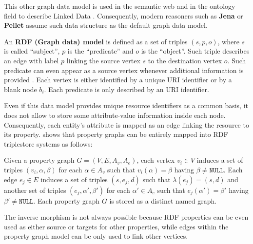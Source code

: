 \label{sec:rdfmodel}
This other graph data model is used in the semantic web  and in the ontology field to describe Linked Data
\cite{NautiLOD,Hartig2015}.  Consequently, modern reasoners such as \textbf{Jena} \cite{Jena} or \textbf{Pellet} \cite{Pellet}
assume such data structure as the default graph data model.

\begin{definition}
	An \textbf{RDF (Graph data) model} \cite{GutierrezInclusion} is defined as a
	set of triples $(s,p,o)$, where $s$ is called ``subject'', $p$ is the ``predicate'' and $o$ is the ``object''.
	Such triple describes an edge with label $p$ linking the source vertex $s$ to the destination vertex $o$.
	Such predicate can even appear as a source vertex
	whenever additional information is provided \cite{DasSPCB14}.
	 Each
	vertex is either identified by a unique URI identifier or by a blank node $b_i$. Each predicate is only described by
	an URI identifier. \qedsymbol
\end{definition}

Even if this data model provides unique resource identifiers as a common basis, it does not allow to store some
attribute-value information inside each node. Consequently, each entity's attribute is mapped as an edge linking the
resource to its property.
 \cite{DasSPCB14} shows that
 property graphs can be entirely mapped into RDF triplestore systems
 as follows:
 \begin{definition}\label{def:map}
 	Given a property graph $G=(V,E,A_v,A_e)$, each vertex
 	$v_i\in V$ induces a set of triples $(v_i,\alpha,\beta)$ for each $\alpha\in A_v$ such that $v_i(\alpha)=\beta$
 	having $\beta\neq\texttt{NULL}$. Each edge $e_j\in E$ induces a set of triples $(s,e_j,d)$ such that
 	$\lambda(e_j)=(s,d)$ and another set of triples $(e_j,\alpha',\beta')$ for each $\alpha'\in A_e$ such that
 	$e_j(\alpha')=\beta'$ having $\beta'\neq\texttt{NULL}$. Each property graph $G$ is stored as a distinct
 	named graph.
 \end{definition}

The inverse morphism is not always possible because RDF properties can be even used as either source or targets for other properties, while edges within the property graph model can be only used to link other vertices. 